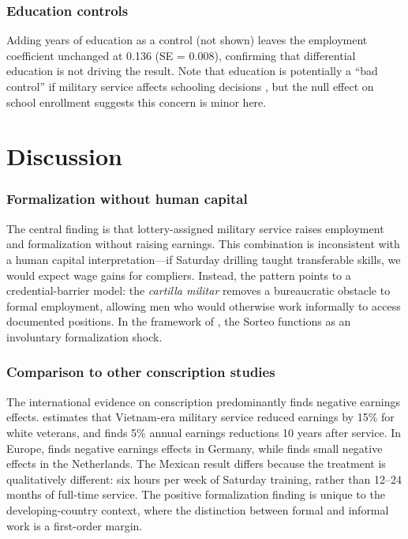 \documentclass[12pt]{article}
\begin{document}
\subsubsection*{Education controls} Adding years of education as a control (not shown) leaves the employment coefficient unchanged at 0.136 (SE = 0.008), confirming that differential education is not driving the result. Note that education is potentially a ``bad control'' if military service affects schooling decisions \citep{angrist2009}, but the null effect on school enrollment suggests this concern is minor here.


\section{Discussion}

\subsubsection*{Formalization without human capital} The central finding is that lottery-assigned military service raises employment and formalization without raising earnings. This combination is inconsistent with a human capital interpretation---if Saturday drilling taught transferable skills, we would expect wage gains for compliers. Instead, the pattern points to a credential-barrier model: the \textit{cartilla militar} removes a bureaucratic obstacle to formal employment, allowing men who would otherwise work informally to access documented positions. In the framework of \citet{levy2008}, the Sorteo functions as an involuntary formalization shock.

\subsubsection*{Comparison to other conscription studies} The international evidence on conscription predominantly finds negative earnings effects. \citet{angrist1990} estimates that Vietnam-era military service reduced earnings by 15\% for white veterans, and \citet{angristchen2011} finds 5\% annual earnings reductions 10 years after service. In Europe, \citet{bauer2012} finds negative earnings effects in Germany, while \citet{card2011} finds small negative effects in the Netherlands. The Mexican result differs because the treatment is qualitatively different: six hours per week of Saturday training, rather than 12--24 months of full-time service. The positive formalization finding is unique to the developing-country context, where the distinction between formal and informal work is a first-order margin.
\end{document}
